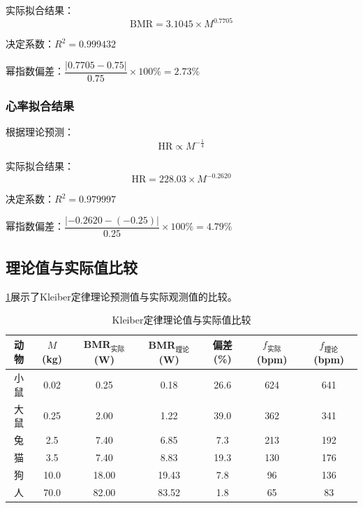 实际拟合结果：
\begin{equation}
\text{BMR} = 3.1045 \times M^{0.7705}
\label{eq:bmr-fitted}
\end{equation}

决定系数：$R^2 = 0.999432$

幂指数偏差：$\dfrac{|0.7705 - 0.75|}{0.75} \times 100\% = 2.73\%$

\subsubsection{心率拟合结果}

根据理论预测：
\begin{equation}
\text{HR} \propto M^{-\frac{1}{4}}
\label{eq:hr-theoretical}
\end{equation}

实际拟合结果：
\begin{equation}
\text{HR} = 228.03 \times M^{-0.2620}
\label{eq:hr-fitted}
\end{equation}

决定系数：$R^2 = 0.979997$

幂指数偏差：$\dfrac{|-0.2620 - (-0.25)|}{0.25} \times 100\% = 4.79\%$

\subsection{理论值与实际值比较}

\cref{tab:comparison}展示了Kleiber定律理论预测值与实际观测值的比较。

\begin{table}[H]
\caption{Kleiber定律理论值与实际值比较}
\label{tab:comparison}
\centering
\begin{tabular}{ccccccc}
\toprule[1.5pt]
动物 & $M$ (kg) & BMR$_{实际}$ (W) & BMR$_{理论}$ (W) & 偏差(\%) & $f_{实际}$ (bpm) & $f_{理论}$ (bpm) \\
\midrule[1pt]
小鼠 & 0.02 & 0.25 & 0.18 & 26.6 & 624 & 641 \\
大鼠 & 0.25 & 2.00 & 1.22 & 39.0 & 362 & 341 \\
兔 & 2.5 & 7.40 & 6.85 & 7.3 & 213 & 192 \\
猫 & 3.5 & 7.40 & 8.83 & 19.3 & 130 & 176 \\
狗 & 10.0 & 18.00 & 19.43 & 7.8 & 96 & 136 \\
人 & 70.0 & 82.00 & 83.52 & 1.8 & 65 & 83 \\
\bottomrule[1.5pt]
\end{tabular}
\end{table}

